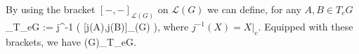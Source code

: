 By using the bracket $[-,-]_{\mathcal{L}(G)}$ on $\mathcal{L}(G)$ we can define, for any $A,B\in T_eG$
\bse
[A,B]_{T_eG} := j^{-1} \bigl( [j(A),j(B)]_{(G)} \bigr),
\ese
where $j^{-1}(X)=X|_e$. Equipped with these brackets, we have
\bse
{}(G)\cong_T_eG.
\ese


















